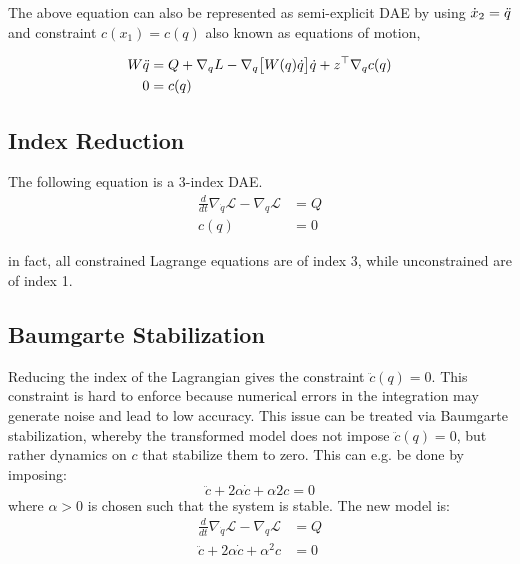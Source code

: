 The above equation can also be represented as semi-explicit DAE by using $\Dot{x}_2 = \Ddot{q}$ and constraint $c(x_1) = c(q)$ also known as equations of motion,

\begin{align*}
    \begin{split}
        W\Ddot{q} &= Q + \nabla_q L - \nabla_q \big[W(q)\Dot{q}\big]\Dot{q} + z^\top\nabla_q c(q)
        \\
        0 &= c(q)
    \end{split}
\end{align*}



\subsection{Index Reduction}

The following equation is a 3-index DAE. 
\begin{equation}
\label{eq:constrained_lagrange}
    \begin{aligned}
       \frac{d}{dt}\nabla_{\dot{q}}\mathcal{L}-\nabla_q\mathcal{L}&=Q \\
        c(q) &= 0 
    \end{aligned}
\end{equation}

in fact, all constrained Lagrange equations are of index 3, while unconstrained are of index 1.




\subsection{Baumgarte Stabilization}\label{section:Baumgarte}
Reducing the index of the Lagrangian gives the constraint $\ddot c(q) = 0$. This constraint is hard to enforce because numerical errors in the integration may generate noise and lead to low accuracy. This issue can be treated via Baumgarte stabilization, whereby the transformed model does not impose $\ddot c(q) = 0$, but rather dynamics on $c$ that stabilize them to zero. This can e.g. be done by imposing:
$$
\ddot c + 2\alpha \dot c + \alpha 2c = 0 
$$
where $\alpha>0$ is chosen such that the system is stable. The new model is:
\begin{equation*}
\begin{aligned}
\frac{d}{dt}\nabla_{\dot{q}}\mathcal{L}-\nabla_q\mathcal{L}&=Q \\
\ddot{c}+2 \alpha \dot{c}+\alpha^2 {c}&=0
\end{aligned}
\end{equation*}

